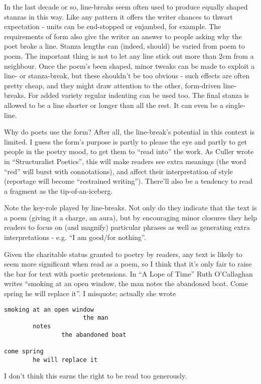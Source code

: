 \documentclass[11pt]{article}
\begin{document}
In the last decade or so, line-breaks seem often used to produce equally shaped stanzas in
this way. Like any pattern it offers the writer chances to thwart expectation - units can be end-stopped or enjambed, for example. The requirements of form also give the writer an answer to people asking why the poet broke a line. Stanza lengths can (indeed, should) be varied from poem to poem. The important thing is not to let any line stick out more than 2cm from a neighbour. Once the poem's been shaped, minor tweaks can be made to exploit a line- or stanza-break, but these shouldn't be too obvious - such effects are often pretty cheap, and they might draw attention to the other, form-driven line-breaks. For added variety regular indenting can be used too. The final stanza is allowed to be a line shorter or longer than all the rest. It can even be a  single-line.


Why do poets use the form? After all, the line-break's potential in this context is limited. I guess the form's purpose is partly to please the eye and partly to get people in the poetry mood, to get them to ``read into'' the work. As Culler wrote in ``Structuralist Poetics'', this will make readers see extra meanings (the word ``red'' will burst with connotations), and affect their interpretation of style (reportage will become ``restrained writing''). There'll also be a tendency to read a fragment as the tip-of-an-iceberg.

Note the key-role played by line-breaks. Not only do they indicate that the text is a poem (giving it a charge, an aura), but by encouraging minor closures they help readers to focus on (and magnify) particular phrases 
as well as generating extra interpretations - e.g. ``I am good/for nothing''.

Given the charitable status granted to poetry by readers, any text is likely to seem more significant when read as a poem, so I think that it's only fair to raise the bar for text with poetic pretensions. In ``A Lope of Time'' Ruth O'Callaghan writes ``smoking at an open window, the man notes the abandoned boat. Come spring he will replace it''. I misquote; actually she wrote
\begin{verbatim}
smoking at an open window
                      the man
        notes
                the abandoned boat

come spring 
        he will replace it
\end{verbatim}

I don't think this earns the right to be read too generously.
\end{document}
